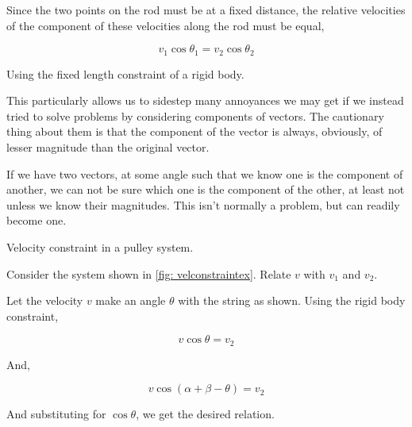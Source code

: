 Since the two points on the rod must be at a fixed distance, the relative velocities of the
 component of these velocities along the rod must be equal,

 \begin{equation}
    \boxed{v_1\cos\theta_1 = v_2\cos\theta_2}
 \end{equation}

\begin{marginfigure}
    \caption{Using the fixed length constraint of a rigid body.}
\end{marginfigure}

This particularly allows us to sidestep many annoyances we may get if we 
instead tried to solve problems by considering components of vectors. The cautionary thing 
about them is that the component of the vector is always, obviously, of lesser magnitude than 
the original vector.

If we have two vectors, at some angle such that we know one is the component of another, we
can not be sure which one is the component of the other, at least not unless we 
know their magnitudes. This isn't normally a problem, but can readily become one.

\begin{marginfigure}
    \caption{Velocity constraint in a pulley system.}
    \label{fig: velconstraintex}
\end{marginfigure}

\begin{marginfigure}
\end{marginfigure}


\begin{example}
    Consider the system shown in \cref{fig: velconstraintex}. Relate \(v\) with
    \(v_1\) and \(v_2\).
    
    \begin{soln}
        Let the velocity \(v\) make an angle \(\theta\) with the string as shown.
        Using the rigid body constraint,

        \begin{equation*}
            v\cos\theta = v_2
        \end{equation*}

        And,

        \begin{equation*}
            v\cos(\alpha+\beta-\theta) = v_2
        \end{equation*}

        And substituting for \(\cos\theta\), we get the desired relation.
    \end{soln}
\end{example}


